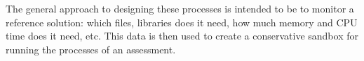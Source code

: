 The general approach to designing these processes is intended to be to monitor
a reference solution: which files, libraries does it need, how much memory and
CPU time does it need, etc. This data is then used to create a conservative
sandbox for running the processes of an assessment.










